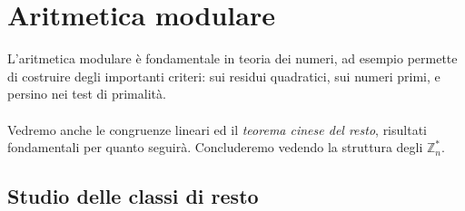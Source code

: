 \chapter{Aritmetica modulare}
L'aritmetica modulare è fondamentale in teoria dei numeri, ad esempio permette di costruire degli importanti criteri: sui residui quadratici, sui numeri primi, e persino nei test di primalità. \\ \\ Vedremo anche le congruenze lineari ed il \textit{teorema cinese del resto}, risultati fondamentali per quanto seguirà. Concluderemo vedendo la struttura degli $\mathbb{Z}_n^*$.



\section{Studio delle classi di resto}
\label{lezione6}
